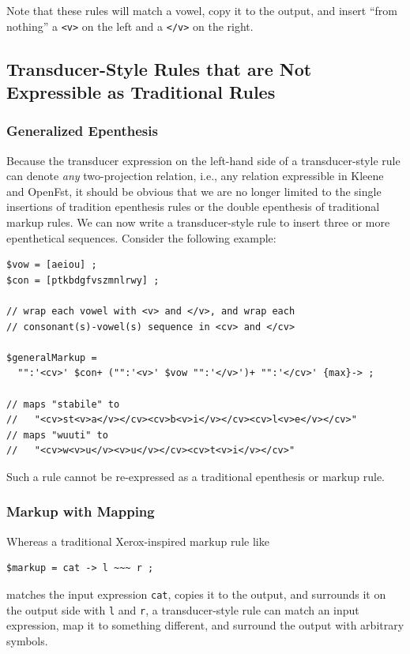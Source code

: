 \noindent
Note that these rules will match a vowel, copy it to the output, and 
insert ``from nothing'' a \verb!<v>!
on the left and a \verb!</v>! on the right.


\subsection{Transducer-Style Rules that are Not Expressible as Traditional Rules}

\subsubsection{Generalized Epenthesis}

Because the transducer expression on the left-hand side of a
transducer-style rule can denote \emph{any} two-projection relation,
i.e., any relation expressible in Kleene and OpenFst, it should be
obvious that we are no longer limited to the single insertions of
tradition epenthesis rules or the double epenthesis of traditional
markup rules.  We can now write a transducer-style rule to insert three
or more epenthetical sequences.  Consider the following example:

\begin{Verbatim}
$vow = [aeiou] ;
$con = [ptkbdgfvszmnlrwy] ;

// wrap each vowel with <v> and </v>, and wrap each 
// consonant(s)-vowel(s) sequence in <cv> and </cv>

$generalMarkup = 
  "":'<cv>' $con+ ("":'<v>' $vow "":'</v>')+ "":'</cv>' {max}-> ;

// maps "stabile" to 
//   "<cv>st<v>a</v></cv><cv>b<v>i</v></cv><cv>l<v>e</v></cv>"
// maps "wuuti" to 
//   "<cv>w<v>u</v><v>u</v></cv><cv>t<v>i</v></cv>"
\end{Verbatim}

\noindent
Such a rule cannot be re-expressed as a traditional epenthesis or markup rule.

\subsubsection{Markup with Mapping}

Whereas a traditional Xerox-inspired markup rule like

\begin{Verbatim}
$markup = cat -> l ~~~ r ;
\end{Verbatim}

\noindent
matches the input expression \verb!cat!, copies it to the output, and surrounds it on the output side with \verb!l! and \verb!r!, a
transducer-style rule can match an input expression, map it to something different, and
surround the output with arbitrary symbols.

